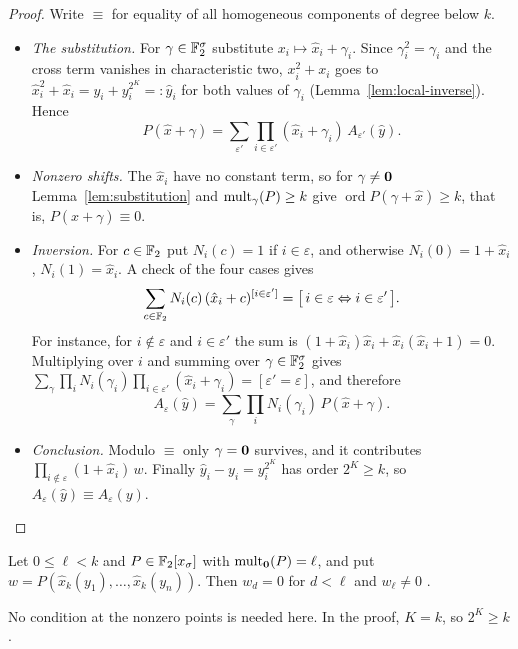 \begin{proof}
Write \(\equiv\) for equality of all homogeneous components of degree below \(k\).
\begin{itemize}
 \item \emph{The substitution.} For \(\gamma\in\mathbb F_2^\sigma\) substitute
 \(x_i\mapsto\hat x_i+\gamma_i\). Since \(\gamma_i^2=\gamma_i\) and the cross term
 vanishes in characteristic two, \(x_i^2+x_i\) goes to
 \(\hat x_i^2+\hat x_i=y_i+y_i^{2^K}=:\hat y_i\) for both values of \(\gamma_i\)
 (Lemma~\ref{lem:local-inverse}). Hence
 \[
  P(\hat x+\gamma)=\sum_{\varepsilon'}\prod_{i\in\varepsilon'}(\hat x_i+\gamma_i)\,
  A_{\varepsilon'}(\hat y).
 \]
 \item \emph{Nonzero shifts.} The \(\hat x_i\) have no constant term, so for
 \(\gamma\ne\mathbf 0\) Lemma~\ref{lem:substitution} and \(\operatorname{mult}_\gamma(P)\ge k\) give
 \(\operatorname{ord}P(\gamma+\hat x)\ge k\), that is, \(P(\hat x+\gamma)\equiv0\).
 \item \emph{Inversion.} For \(c\in\mathbb F_2\) put \(N_i(c)=1\) if \(i\in\varepsilon\), and
 otherwise \(N_i(0)=1+\hat x_i\), \(N_i(1)=\hat x_i\). A check of the four cases
 gives
 \[
  \sum_{c\in\mathbb F_2}N_i(c)\,(\hat x_i+c)^{[i\in\varepsilon']}
  =\bigl[\,i\in\varepsilon\Leftrightarrow i\in\varepsilon'\,\bigr].
 \]
 For instance, for \(i\notin\varepsilon\) and \(i\in\varepsilon'\) the sum is
 \((1+\hat x_i)\hat x_i+\hat x_i(\hat x_i+1)=0\). Multiplying over \(i\) and summing
 over \(\gamma\in\mathbb F_2^\sigma\) gives
 \(\sum_\gamma\prod_iN_i(\gamma_i)\prod_{i\in\varepsilon'}(\hat x_i+\gamma_i)
 =[\varepsilon'=\varepsilon]\), and therefore
 \[
  A_\varepsilon(\hat y)=\sum_{\gamma}\prod_iN_i(\gamma_i)\,P(\hat x+\gamma).
 \]
 \item \emph{Conclusion.} Modulo \(\equiv\) only \(\gamma=\mathbf 0\) survives, and it
 contributes \(\prod_{i\notin\varepsilon}(1+\hat x_i)\,w\). Finally
 \(\hat y_i-y_i=y_i^{2^K}\) has order \(2^K\ge k\), so
 \(A_\varepsilon(\hat y)\equiv A_\varepsilon(y)\). \qedhere
\end{itemize}
\end{proof}

\begin{lemma}\label{lem:lowest-part}
Let \(0\le\ell<k\) and \(P\in\mathbb F_2[x_\sigma]\) with \(\operatorname{mult}_{\mathbf 0}(P)=\ell\), and put
\(w=P(\hat x_k(y_1),\ldots,\hat x_k(y_n))\). Then \(w_d=0\) for \(d<\ell\) and
\(w_\ell\ne0\) .
\end{lemma}

\noindent No condition at the nonzero points is needed here. In the proof,
\(K=k\), so \(2^K\ge k\).

